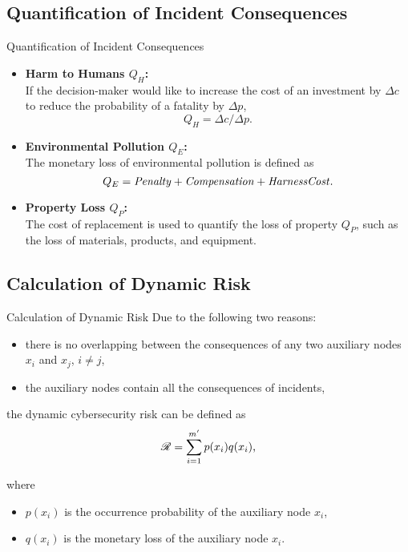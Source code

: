\subsection{Quantification of Incident Consequences}
\begin{frame}{Quantification of Incident Consequences}
    \label{Dynamic Risk Assessment: Quantification of Incident Consequences}
    \begin{itemize}
      \item \textbf{Harm to Humans $Q_H$:}\\
      If the decision-maker would like to increase the cost of an investment by $\Delta c$ to reduce the  probability of a fatality by $\Delta p$,
      \[
        Q_H = \Delta c/\Delta p\text{.}
      \]
      \item \textbf{Environmental Pollution $Q_E$:}\\
      The monetary loss of environmental pollution is defined as
      \[
        Q_E = {\it Penalty} + {\it Compensation} + {\it HarnessCost}\text{.}
      \]
      \item \textbf{Property Loss $Q_P$:}\\
      The cost of replacement is used to quantify the loss of property $Q_P$, such as the loss of  materials, products, and equipment.
    \end{itemize}
\end{frame}

\subsection{Calculation of Dynamic Risk}
\begin{frame}{Calculation of Dynamic Risk}
    \label{Dynamic Risk Assessment: Calculation of Dynamic Risk}
    Due to the following two reasons:
    \begin{itemize}
      \item there is no overlapping between the consequences of any two auxiliary nodes $x_i$ and $x_j$, $i\neq j$,
      \item the auxiliary nodes contain all the consequences of incidents,
    \end{itemize}

    the dynamic cybersecurity risk can be defined as
    \[
        \mathscr{R} = \sum_{i=1}^{m'}p(x_i)q(x_i)\text{,}
    \]

    where
    \begin{itemize}
      \item $p(x_i)$ is the occurrence probability of the auxiliary node $x_i$,
      \item $q(x_i)$ is the monetary loss of the auxiliary node $x_i$.
    \end{itemize}

\end{frame} 